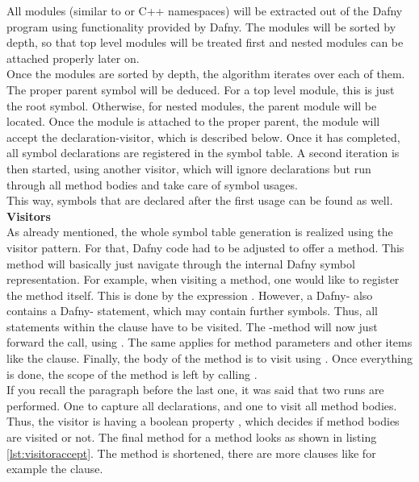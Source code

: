 All modules (similar to \CsharpWithSpace or C++ namespaces) will be extracted out of the Dafny program using functionality provided by Dafny.
The modules will be sorted by depth, so that top level modules will be treated first and nested modules can be attached properly later on.\\

Once the modules are sorted by depth, the algorithm iterates over each of them.
The proper parent symbol will be deduced.
For a top level module, this is just the root symbol.
Otherwise, for nested modules, the parent module will be located.
Once the module is attached to the proper parent, the module will accept the declaration-visitor, which is described below.
Once it has completed, all symbol declarations are registered in the symbol table.
A second iteration is then started, using another visitor, which will ignore declarations but run through all method bodies
and take care of symbol usages.\\
This way, symbols that are declared after the first usage can be found as well.\\

\textbf{Visitors}\\
As already mentioned, the whole symbol table generation is realized using the visitor pattern. 
For that, Dafny code had to be adjusted to offer a  method.
This method will basically just navigate through the internal Dafny symbol representation.
For example, when visiting a method, one would like to register the method itself.
This is done by the expression .
However, a Dafny- also contains a Dafny- statement, which may contain further symbols.
Thus, all statements within the  clause have to be visited.
The -method will now just forward the call, using .
The same applies for method parameters and other items like the  clause.
Finally, the body of the method is to visit using .
Once everything is done, the scope of the method is left by calling .\\

If you recall the paragraph before the last one, it was said that two runs are performed.
One to capture all declarations, and one to visit all method bodies.
Thus, the visitor is having a boolean property , which decides if method bodies are visited or not.
The final  method for a method looks as shown in listing \ref{lst:visitoraccept}.
The method is shortened, there are more clauses like for example the  clause.


